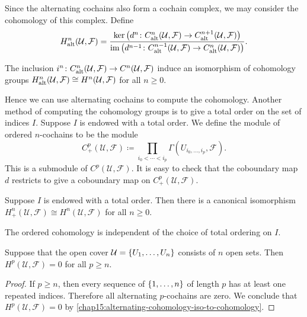 Since the alternating cochains also form a cochain complex, we may consider the cohomology of this complex. Define
\begin{equation*}
	{H}_{\operatorname{alt}}^n(\mathcal{U}, \mathcal{F}) = \frac{\ker \left(d^n \colon C_{\operatorname{alt}}^{n}(\mathcal{U}, \mathcal{F}) \to C_{\operatorname{alt}}^{n + 1}(\mathcal{U}, \mathcal{F})\right)}{\operatorname{im} \left(d^{n - 1} \colon C_{\operatorname{alt}}^{n - 1}(\mathcal{U}, \mathcal{F}) \to C_{\operatorname{alt}}^{n }(\mathcal{U}, \mathcal{F}) \right)}.
\end{equation*}

\begin{lemma}\label{chap15:alternating-cohomology-iso-to-cohomology}
	The inclusion $i^n \colon C_{\operatorname{alt}}^{n}(\mathcal{U}, \mathcal{F}) \to C^{n}(\mathcal{U}, \mathcal{F})$ induce an isomorphism of cohomology groups ${H}_{\operatorname{alt}}^n(\mathcal{U}, \mathcal{F}) \cong {H}^n(\mathcal{U}, \mathcal{F})$ for all $n \geq 0$.
\end{lemma}

Hence we can use alternating cochains to compute the cohomology. Another method of computing the cohomology groups is to give a total order on the set of indices $I$. Suppose $I$ is endowed with a total order. We define the module of ordered $n$-cochains to be the module
\begin{equation*}
	C^p_+(\mathcal{U}, \mathcal{F}) \coloneqq \prod_{i_0 < \dotsb < i_p} \Gamma(U_{i_0, \dotsc, i_p}, \mathcal{F}).
\end{equation*}
This is a submodule of $C^p(\mathcal{U}, \mathcal{F})$. It is easy to check that the coboundary map $d$ restricts to give a coboundary map on $C^p_+(\mathcal{U}, \mathcal{F})$.

\begin{lemma}
	Suppose $I$ is endowed with a total order. Then there is a canonical isomorphism ${H}_{+}^n(\mathcal{U}, \mathcal{F}) \cong {H}^n(\mathcal{U}, \mathcal{F})$ for all $n \geq 0$.
\end{lemma}

\begin{corollary}
	The ordered cohomology is independent of the choice of total ordering on $I$.
\end{corollary}

\begin{proposition}
	Suppose that the open cover $\mathcal{U} = \lbrace U_1, \dotsc, U_n\rbrace$ consists of $n$ open sets. Then $H^p(\mathcal{U}, \mathcal{F}) = 0$ for all $p \geq n$.
\end{proposition}
\begin{proof}
	If $p \geq n$, then every sequence of $\lbrace1, \dotsc, n\rbrace$ of length $p$ has at least one repeated indices. Therefore all alternating $p$-cochains are zero. We conclude that $H^p(\mathcal{U}, \mathcal{F}) = 0$ by \cref{chap15:alternating-cohomology-iso-to-cohomology}.
\end{proof}

